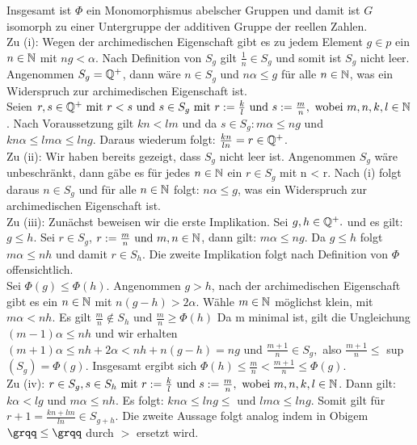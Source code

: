 {\begin{enumerate}
\end{enumerate}
Insgesamt ist $\Phi$ ein Monomorphismus abelscher Gruppen und damit ist $G$ isomorph zu einer Untergruppe der additiven Gruppe der reellen Zahlen.\\ 
Zu (i): Wegen der archimedischen Eigenschaft gibt es zu jedem Element $g \in p$ ein $n \in \mathbb{N}$ mit $ng < \alpha$. Nach Definition von $S_g$ gilt $\frac{1}{n} \in S_g$ und somit ist $S_g$ nicht leer.\\ Angenommen $S_g = \mathbb{Q}^{+}$, dann wäre $n \in S_g$ und $n\alpha \le g$ für alle $n\in\mathbb{N}$, was ein Widerspruch zur archimedischen Eigenschaft ist.\\
Seien $r, s \in \mathbb{Q}^{+} \text{ mit } r < s \text{ und } s \in S_g \text { mit } r := \frac{k}{l} \text{ und } s:= \frac{m}{n}, \text{ wobei } m, n ,k, l \in \mathbb{N}$. Nach Voraussetzung gilt $kn < lm $ und da $s \in S_g: m\alpha \le ng$ und $kn\alpha \le lm\alpha \le lng.$ Daraus wiederum folgt: $\frac{kn}{ln} = r \in \mathbb{Q}^{+}$.\\
Zu (ii): Wir haben bereits gezeigt, dass $S_g$ nicht leer ist. Angenommen $S_g$ wäre unbeschränkt, dann gäbe es für jedes $n \in \mathbb{N}$ ein $r \in S_g$ mit n < r. Nach (i) folgt daraus $n \in S_g$ und für alle $n \in \mathbb{N}$ folgt: $ n\alpha \le g$, was ein Widerspruch zur archimedischen Eigenschaft ist.\\
Zu (iii): Zunächst beweisen wir die erste Implikation. Sei  $g, h \in \mathbb{Q}^{+}.$ und es gilt: $g \le h$. Sei $r \in S_g$, $r:= \frac{m}{n} \text{ und } m, n \in \mathbb{N} $, dann gilt: $m\alpha \le ng$. Da $g \le h$ folgt $ m\alpha \le n h$ und damit $r \in S_h$. Die zweite Implikation folgt nach Definition von $\Phi$ offensichtlich.\\
Sei $\Phi\left(g\right) \le \Phi\left(h\right)$. Angenommen $g > h$, nach der archimedischen Eigenschaft gibt es ein $ n \in \mathbb{N}$ mit $n\left(g-h\right) > 2\alpha$. Wähle $m \in \mathbb{N}$ möglichst klein, mit $m\alpha < nh$. Es gilt $\frac{m}{n} \notin S_h$ und $\frac{m}{n} \geq \Phi\left(h\right)$
Da m minimal ist, gilt die Ungleichung $\left(m-1\right)\alpha \le nh$ und wir erhalten $ \left(m+1\right)\alpha \le nh + 2\alpha < nh + n(g-h) = ng$ und $\frac{m+1}{n} \in S_g,$ also $\frac{m+1}{n} \leq$ sup$\left(S_g\right) = \Phi\left(g\right)$. Insgesamt ergibt sich $\Phi\left(h\right) \le \frac{m}{n} < \frac{m + 1}{n} \le \Phi\left(g\right)$.\\
Zu (iv):  $r \in S_g, s \in S_h \text{ mit } r := \frac{k}{l} \text{ und } s:= \frac{m}{n}, \text{ wobei } m, n ,k, l \in \mathbb{N}$. Dann gilt: $k\alpha < lg $ und $ m\alpha \le nh$. Es folgt: $kn\alpha \le lng \le \text{ und } lm\alpha \le lng.$ Somit gilt für $r+1 = \frac{kn+lm}{ln} \in S_{g+h}.$ Die zweite Aussage folgt analog indem in Obigem $\grqq \le\grqq$ durch $>$ ersetzt wird.\\
}
